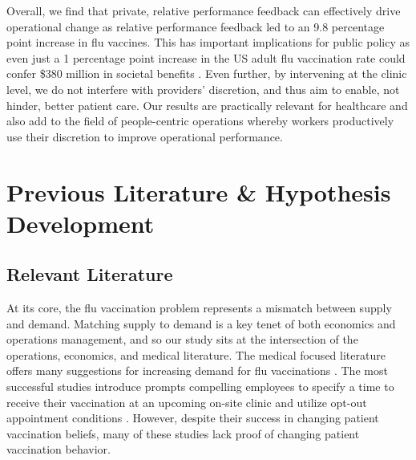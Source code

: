 \begin{onehalfspace}
 Overall, we find that private, relative performance feedback can effectively drive operational change as relative performance feedback led to an 9.8 percentage point increase in flu vaccines. This has important implications for public policy as even just a 1 percentage point increase in the US adult flu vaccination rate could confer \$380 million in societal benefits \citep{White2021}. Even further, by intervening at the clinic level, we do not interfere with providers’ discretion, and thus aim to enable, not hinder, better patient care. Our results are practically relevant for healthcare and also add to the field of people-centric operations whereby workers productively use their discretion to improve operational performance. 

 
\section{Previous Literature \& Hypothesis Development} \label{HD_CC}
 \subsection{Relevant Literature}
 At its core, the flu vaccination problem represents a mismatch between supply and demand. Matching supply to demand is a key tenet of both economics and operations management, and so our study sits at the intersection of the operations, economics, and medical literature. The medical focused literature offers many suggestions for increasing demand for flu vaccinations \citep[see][]{Brewer2017}. The most successful studies introduce prompts compelling employees to specify a time to receive their vaccination at an upcoming on-site clinic \citep{Milkman2011} and utilize opt-out appointment conditions \citep{Chapman2010,Chapman2016}. However, despite their success in changing patient vaccination beliefs, many of these studies lack proof of changing patient vaccination behavior.
	

\end{onehalfspace}
